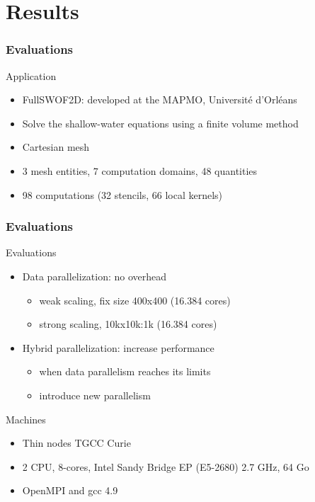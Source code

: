 \documentclass{beamer}
\begin{document}

\section{Results}
\begin{frame}
\frametitle{Evaluations}
\begin{block}{Application}
\begin{itemize}
\item FullSWOF2D: developed at the MAPMO, Université d'Orléans
\item Solve the shallow-water equations using a finite volume method
\item Cartesian mesh
\item 3 mesh entities, 7 computation domains, 48 quantities
\item 98 computations (32 stencils, 66 local kernels)
\end{itemize}
\end{block}
\end{frame}
\begin{frame}
\frametitle{Evaluations}
\begin{block}{Evaluations}
\begin{itemize}
\item Data parallelization: no overhead
  \begin{itemize}
  \item weak scaling, fix size 400x400 (16.384 cores)
  \item strong scaling, 10kx10k:1k (16.384 cores)
  \end{itemize}
\item Hybrid parallelization: increase performance\\
  \begin{itemize}
  \item when data parallelism reaches its limits
  \item introduce new parallelism
  \end{itemize}
\end{itemize}
\end{block}

\begin{block}{Machines}
\begin{itemize}
\item Thin nodes TGCC Curie
\item 2 CPU, 8-cores, Intel Sandy Bridge EP (E5-2680) 2.7 GHz, 64 Go
\item OpenMPI and gcc 4.9
\end{itemize}
\end{block}
\end{frame}
\end{document}
